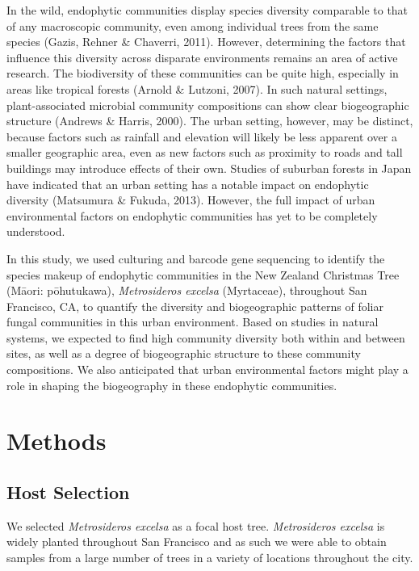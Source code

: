 \documentclass[fleqn,10pt,lineno]{wlpeerj} %
\begin{document}
In the wild, endophytic communities display species diversity comparable to that of any macroscopic community, even among individual trees from the same species (Gazis, Rehner \& Chaverri, 2011). However, determining the factors that influence this diversity across disparate environments remains an area of active research. The biodiversity of these communities can be quite high, especially in areas like tropical forests (Arnold \& Lutzoni, 2007). In such natural settings, plant-associated microbial community compositions can show clear biogeographic structure (Andrews \& Harris, 2000). The urban setting, however, may be distinct, because factors such as rainfall and elevation will likely be less apparent over a smaller geographic area, even as new factors such as proximity to roads and tall buildings may introduce effects of their own. Studies of suburban forests in Japan have indicated that an urban setting has a notable impact on endophytic diversity (Matsumura \& Fukuda, 2013). However, the full impact of urban environmental factors on endophytic communities has yet to be completely understood.

In this study, we used culturing and barcode gene sequencing to identify the species makeup of endophytic communities in the New Zealand Christmas Tree (Māori: pōhutukawa), \emph{Metrosideros excelsa} (Myrtaceae), throughout San Francisco, CA, to quantify the diversity and biogeographic patterns of foliar fungal communities in this urban environment. Based on studies in natural systems, we expected to find high community diversity both within and between sites, as well as a degree of biogeographic structure to these community compositions. We also anticipated that urban environmental factors might play a role in shaping the biogeography in these endophytic communities.

\hypertarget{methods}{%
\section*{Methods}\label{methods}}

\hypertarget{host-selection}{%
\subsection*{Host Selection}\label{host-selection}}

We selected \emph{Metrosideros excelsa} as a focal host tree. \emph{Metrosideros excelsa} is widely planted throughout San Francisco and as such we were able to obtain samples from a large number of trees in a variety of locations throughout the city.
\end{document}
